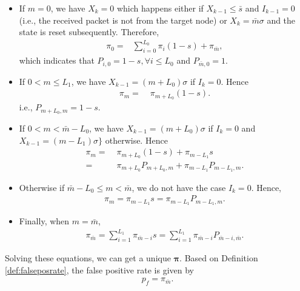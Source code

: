 \documentclass[conference]{IEEEtran}
\begin{document}
\begin{itemize}
\item If $m=0$, we have $X_k=0$ which happens either if $X_{k-1}\leq \bar{s}$ and $I_{k-1}=0$ (i.e., the received packet is not from the target node) or $X_{k}=\bar{m}\sigma$ and the state is reset subsequently. Therefore,
\begin{align}
 \pi_0 =& \sum^{L_0}_{i=0}\pi_{i}(1-s) + \pi_{\bar{m}},
\end{align}
which indicates that $P_{i,0}=1-s, \forall i\leq L_0$ and $P_{\bar{m},0}=1$.

\item If $0<m\leq L_1$, we have $X_{k-1}=(m+L_0)\sigma$ if $I_k=0$. Hence
\begin{align}
 \pi_m = &\; \pi_{m+L_0}(1-s).
\end{align}
i.e., $P_{m+L_0,m}=1-s$.

\item If $0<m<\bar{m}-L_0$, we have $X_{k-1}=(m+L_0)\sigma$ if $I_k=0$ and $X_{k-1}=(m-L_1)\sigma\}$ otherwise. Hence
\begin{align}
\nonumber \pi_m =&\; \pi_{m+L_0}(1-s) + \pi_{m-L_1}s \\
          =&\; \pi_{m+L_0}P_{m+L_0,m} + \pi_{m-L_1}P_{m-L_1,m}.
\end{align}

\item Otherwise if $\bar{m}-L_0\leq m < \bar{m}$, we do not have the case $I_k=0$. Hence,
\begin{align}
    \pi_m =\pi_{m-L_1}s = \pi_{m-L_1}P_{m-L_1,m}.
\end{align}

\item Finally, when $m = \bar{m}$,
\begin{align}
    \pi_{\bar{m}} = \sum^{L_1}_{i=1} \pi_{\bar{m}-i}s = \sum^{L_1}_{i=1}\pi_{\bar{m}-i}P_{\bar{m}-i,\bar{m}}.
\end{align}
\end{itemize}

Solving these equations, we can get a unique $\boldsymbol\pi$. Based on Definition \ref{def:falseposrate}, the false positive rate is given by
\begin{align}
    p_f = \pi_{\bar{m}}.
\end{align}
\end{document}
